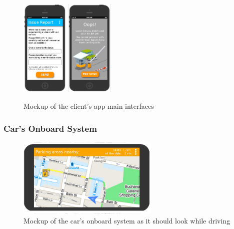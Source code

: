 \documentclass[11pt]{article} %
\begin{document}
\begin{figure}[H]
	\includegraphics[width=0.2\textwidth]{../mockup/12IssueReport.png} 	\hspace{0.8cm}
	\includegraphics[width=0.2\textwidth]{../mockup/10PendingBills.png} 	%
	\caption{Mockup of the client's app main interfaces}
\end{figure}

\subsubsection{Car's Onboard System}
\begin{figure}[H]
	\centering
	\includegraphics[width=0.6\textwidth]{../mockup/CarsSystem} 
	\caption{Mockup of the car's onboard system as it should look while driving}
\end{figure}
\end{document}
